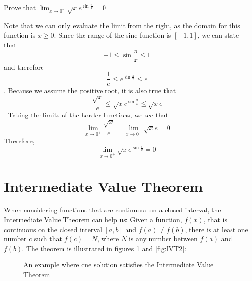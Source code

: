 \begin{Exercise}
    [title= Squeeze Theorem 3, label=squeeze3]
    Prove that $\lim_{x \to 0^+}\sqrt{x}e^{\sin{\frac{\pi}{x}}} = 0$
    \vspace{40mm}
\end{Exercise}

\begin{Answer}
    [ref=squeeze3]
    Note that we can only evaluate the limit from the right, as the domain for this 
    function is $x \geq 0$. Since the range of the sine function is $[-1,1]$, we 
    can state that $$-1 \leq \sin{\frac{\pi}{x}} \leq 1$$ 
    and therefore $$\frac{1}{e} \leq e^{\sin{\frac{\pi}{x}}} \leq e$$. Because 
    we assume the positive root, it is also true that $$\frac{\sqrt{x}}{e} \leq 
    \sqrt{x}e^{\sin{\frac{\pi}{x}}} \leq \sqrt{x}e$$. Taking the limits of the 
    border functions, we see that $$\lim_{x \to 0^+}\frac{\sqrt{x}}{e} = \lim_{x 
    \to 0^+}\sqrt{x}e = 0$$ Therefore, $$\lim_{x \to 0^+}\sqrt{x}e^{\sin{\frac{\pi}
    {x}}}=0$$
\end{Answer}


\section{Intermediate Value Theorem}
When considering functions that are continuous on a closed interval, the 
Intermediate Value Theorem can help us: Given a function, $f(x)$, that is 
continuous on the closed interval $\left[a, b\right]$ and $f(a) \neq f(b)$, 
there is at least one number $c$ such that $f(c) = N$, where $N$ is any number 
between $f(a)$ and $f(b)$. The theorem is illustrated in figures \ref{fig:IVT1} 
and \ref{fig:IVT2}:

\begin{figure}[hbtp]
\centering
{}
\caption{An example where one solution satisfies the Intermediate Value Theorem}
\label{fig:IVT1}
\end{figure}


